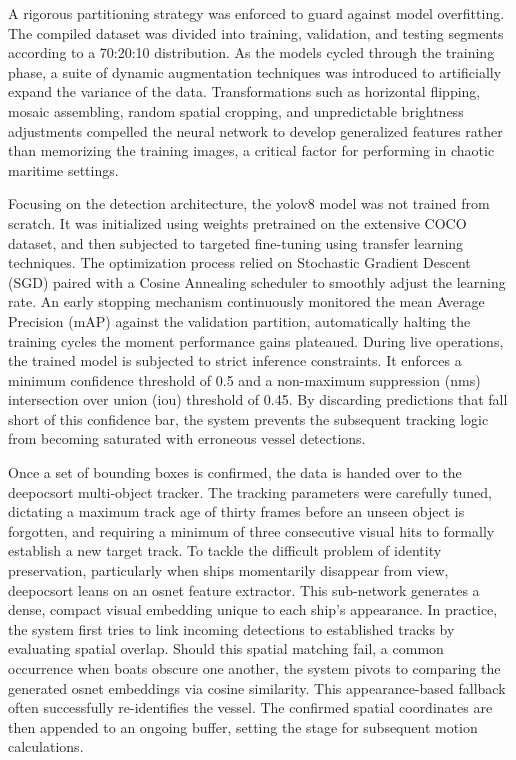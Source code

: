 A rigorous partitioning strategy was enforced to guard against model overfitting. The compiled dataset was divided into training, validation, and testing segments according to a 70:20:10 distribution. As the models cycled through the training phase, a suite of dynamic augmentation techniques was introduced to artificially expand the variance of the data. Transformations such as horizontal flipping, mosaic assembling, random spatial cropping, and unpredictable brightness adjustments compelled the neural network to develop generalized features rather than memorizing the training images, a critical factor for performing in chaotic maritime settings.

Focusing on the detection architecture, the \gls{yolov8} model was not trained from scratch. It was initialized using weights pretrained on the extensive COCO dataset, and then subjected to targeted fine-tuning using transfer learning techniques. The optimization process relied on Stochastic Gradient Descent (SGD) paired with a Cosine Annealing scheduler to smoothly adjust the learning rate. An early stopping mechanism continuously monitored the mean Average Precision (mAP) against the validation partition, automatically halting the training cycles the moment performance gains plateaued. During live operations, the trained model is subjected to strict inference constraints. It enforces a minimum confidence threshold of 0.5 and a non-maximum suppression (\gls{nms}) intersection over union (\gls{iou}) threshold of 0.45. By discarding predictions that fall short of this confidence bar, the system prevents the subsequent tracking logic from becoming saturated with erroneous vessel detections.

Once a set of bounding boxes is confirmed, the data is handed over to the \gls{deepocsort} multi-object tracker. The tracking parameters were carefully tuned, dictating a maximum track age of thirty frames before an unseen object is forgotten, and requiring a minimum of three consecutive visual hits to formally establish a new target track. To tackle the difficult problem of identity preservation, particularly when ships momentarily disappear from view, \gls{deepocsort} leans on an \gls{osnet} feature extractor. This sub-network generates a dense, compact visual embedding unique to each ship's appearance. In practice, the system first tries to link incoming detections to established tracks by evaluating spatial overlap. Should this spatial matching fail, a common occurrence when boats obscure one another, the system pivots to comparing the generated \gls{osnet} embeddings via cosine similarity. This appearance-based fallback often successfully re-identifies the vessel. The confirmed spatial coordinates are then appended to an ongoing buffer, setting the stage for subsequent motion calculations.

